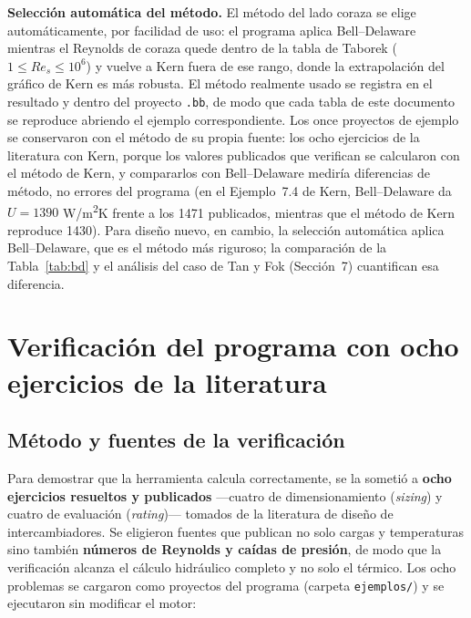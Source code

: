 \documentclass[11pt,a4paper]{article}
\begin{document}
\textbf{Selecci\'on autom\'atica del m\'etodo.} El m\'etodo 
del lado coraza se elige autom\'aticamente, por facilidad de uso: el 
programa aplica Bell--Delaware mientras el Reynolds de coraza quede 
dentro de la tabla de Taborek ($1 \le Re_s \le 10^6$) y vuelve a Kern 
fuera de ese rango, donde la extrapolaci\'on del gr\'afico de Kern es 
m\'as robusta. El m\'etodo realmente usado se registra en el resultado 
y dentro del proyecto \texttt{.bb}, de modo que cada tabla de este 
documento se reproduce abriendo el ejemplo correspondiente. Los once proyectos de ejemplo se conservaron con el m\'etodo de su 
propia fuente: los ocho ejercicios de la literatura con Kern, porque los 
valores publicados que verifican se calcularon con el m\'etodo de Kern, y 
compararlos con Bell--Delaware medir\'ia diferencias de m\'etodo, no 
errores del programa (en el Ejemplo~7.4 de Kern, Bell--Delaware da 
$U = 1390$ W/m\textsuperscript{2}K frente a los 1471 publicados, mientras 
que el m\'etodo de Kern reproduce 1430). Para dise\~no nuevo, en cambio, 
la selecci\'on autom\'atica aplica Bell--Delaware, que es el m\'etodo 
m\'as riguroso; la comparaci\'on de la Tabla~\ref{tab:bd} y el an\'alisis 
del caso de Tan y Fok (Secci\'on~7) cuantifican esa diferencia.

\section{Verificaci\'on del programa con ocho ejercicios de la literatura}
\label{sec:verificacion}

\subsection{M\'etodo y fuentes de la verificaci\'on}

Para demostrar que la herramienta calcula correctamente, se la someti\'o a
\textbf{ocho ejercicios resueltos y publicados} ---cuatro de dimensionamiento
(\emph{sizing}) y cuatro de evaluaci\'on (\emph{rating})--- tomados de la
literatura de dise\~no de intercambiadores. Se eligieron fuentes que publican
no solo cargas y temperaturas sino tambi\'en \textbf{n\'umeros de Reynolds
y ca\'idas de presi\'on}, de modo que la verificaci\'on alcanza el
c\'alculo hidr\'aulico completo y no solo el t\'ermico. Los ocho problemas
se cargaron como proyectos del programa (carpeta \texttt{ejemplos/}) y se
ejecutaron sin modificar el motor:
\end{document}

